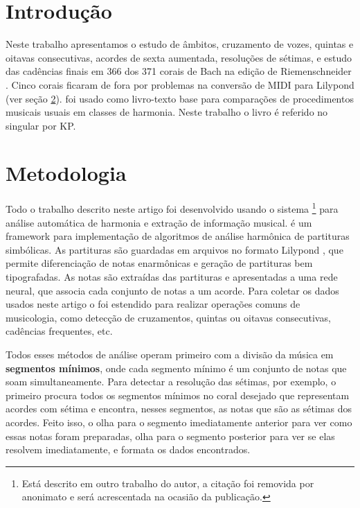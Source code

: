 \section{Introdução}
\label{sec:introducao}

Neste trabalho apresentamos o estudo de âmbitos, cruzamento de vozes,
quintas e oitavas consecutivas, acordes de sexta aumentada, resoluções
de sétimas, e estudo das cadências finais em 366 dos 371 corais de
Bach na edição de Riemenschneider \cite{bach41:371}. Cinco corais
ficaram de fora por problemas na conversão de MIDI para Lilypond (ver
seção \ref{sec:metodologia}). \cite{kostka.ea00:tonal} foi usado como
livro-texto base para comparações de procedimentos musicais usuais em
classes de harmonia. Neste trabalho o livro é referido no singular por
KP.

\section{Metodologia}
\label{sec:metodologia}

Todo o trabalho descrito neste artigo foi desenvolvido usando o
sistema \rameau{}\footnote{Está descrito em outro trabalho do autor, a
  citação foi removida por anonimato e será acrescentada na ocasião da
  publicação.} para análise automática de harmonia e extração de
informação musical. \rameau{} é um framework para implementação de
algoritmos de análise harmônica de partituras simbólicas. As
partituras são guardadas em arquivos no formato Lilypond
\cite{nienhuys.ea08:lilypond}, que permite diferenciação de notas
enarmônicas e geração de partituras bem tipografadas. As notas são
extraídas das partituras e apresentadas a uma rede neural, que associa
cada conjunto de notas a um acorde.  Para coletar os dados usados
neste artigo o \rameau{} foi estendido para realizar operações comuns
de musicologia, como detecção de cruzamentos, quintas ou oitavas
consecutivas, cadências frequentes, etc.

Todos esses métodos de análise operam primeiro com a divisão da música
em \textbf{segmentos mínimos}, onde cada segmento mínimo é um conjunto
de notas que soam simultaneamente. Para detectar a resolução das
sétimas, por exemplo, o \rameau{} primeiro procura todos os segmentos
mínimos no coral desejado que representam acordes com sétima e
encontra, nesses segmentos, as notas que são as sétimas dos
acordes. Feito isso, o \rameau{} olha para o segmento imediatamente
anterior para ver como essas notas foram preparadas, olha para o
segmento posterior para ver se elas resolvem imediatamente, e formata
os dados encontrados.

